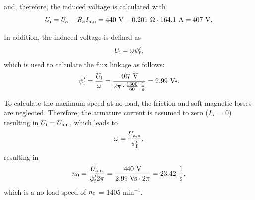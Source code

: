 \begin{solutionblock}
	and, therefore, the induced voltage is calculated with
	\begin{equation}
		\Ui = \Ua - \Ra I_{\mathrm{a,n}}
		= 440 \ \si{V} - 0.201 \ \si{\Omega} \cdot 164.1 \ \si{A}
		= 407 \ \si{V}.
	\end{equation}

	In addition, the induced voltage is defined as
	\begin{equation}
		\Ui = \omega \psi_\mathrm{f}',
	\end{equation}
	which is used to calculate the flux linkage as follows:
	\begin{equation}
		\psi_{\mathrm{f}}' = \frac{\Ui}{\omega}
		= \frac{407 \ \si{V}}{2\pi \cdot \frac{1300}{60} \ \si{\frac{1}{s}}}
		= 2.99 \ \si{Vs}.
	\end{equation}

	To calculate the maximum speed at no-load, the friction and soft magnetic losses are neglected. Therefore, the armature current is assumed to zero ($\Ia$ = 0) resulting in $U_{\mathrm{i}} = \Uan$, which leads to
	\begin{equation}
		\omega = \frac{\Uan}{\psi_{\mathrm{f}}'},
	\end{equation}
	resulting in
	\begin{equation}
		\nO = \frac{\Uan}{\psi_{\mathrm{f}}' 2 \pi} = \frac{440 \ \si{V}}{2.99 \ \si{Vs} \cdot 2 \pi}
		= 23.42 \ \si{\frac{1}{s}},
	\end{equation}
	which is a no-load speed of $\nO$ = 1405 $\mathrm{min^{-1}}$.

\end{solutionblock}


